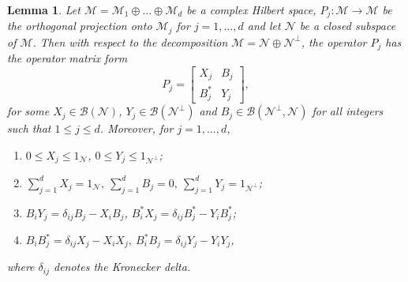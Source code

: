 \documentclass[11pt, reqno]{amsart}
\newtheorem{lemma}[theorem]{Lemma}
\newcommand\1{\boldsymbol {1}}
\numberwithin{equation}{section}
\begin{document}
\begin{lemma}\label{projectiononcdlemma} 
Let $\mathcal{M} = \mathcal{M}_{1}\oplus \hdots \oplus \mathcal{M}_{d}$ be a complex Hilbert space, $P_{j}:\mathcal{M}\rightarrow \mathcal{M}$ be the orthogonal projection onto $\mathcal{M}_{j}$ for $j=1,\hdots,d$ and let $\mathcal{N}$ be a closed subspace of $\mathcal{M}$. Then with respect to the decomposition $\mathcal{M} = \mathcal{N} \oplus \mathcal{N}^{\perp}$, the operator $P_{j}$ has the operator matrix form
\begin{equation}\label{projectiononmd}
P_{j} =\begin{bmatrix}
    X_{j}       & B_{j} \\
    B^{*}_{j}      & Y_{j} 
\end{bmatrix},
\end{equation}
for some $X_{j}\in \mathcal{B}(\mathcal{N})$, $Y_{j} \in \mathcal{B}(\mathcal{N}^{\perp})$ and $B_{j} \in \mathcal{B}(\mathcal{N}^{\perp},\mathcal{N})$ for all integers such that $1\leq j \leq d$. Moreover, for $j=1,\hdots, d$,
\begin{enumerate}
  \item  $0 \leq X_{j} \leq 1_{\mathcal{N}}$, $ 0 \leq Y_{j} \leq 1_{\mathcal{N}^{\perp}}$;
  \item $\sum_{j=1}^{d} X_{j} = 1_{\mathcal{N}},~\sum_{j=1}^{d} B_{j} = 0, ~ \sum_{j=1}^{d} Y_{j} = 1_{\mathcal{N}^{\perp}}$;
  \item $B_{i}Y_{j} =  \delta_{ij}B_{j}-X_{i}B_{j}$, $B_{i}^{*}X_{j} =  \delta_{ij}B_{j}^{*}-Y_{i}B_{j}^{*} $;
  \item $B_{i}B^{*}_{j} =  \delta_{ij}X_{j}-X_{i}X_{j}, ~B^{*}_{i}B_{j} =  \delta_{ij}Y_{j}-Y_{i}Y_{j}$,
\end{enumerate}
where $\delta_{ij}$ denotes the Kronecker delta.
\end{lemma}
\end{document}
